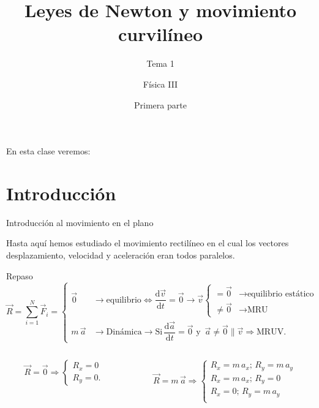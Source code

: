 \documentclass[11pt,handout,aspectratio=1610]{beamer}
\title{Leyes de Newton y movimiento curvilíneo}
\subtitle{Tema 1}
\author{Física III}
\institute{Instituto de Tecnología e Ingeniería \\ \vspace{0.25cm} Universidad Nacional de Hurlingham}
\date{Primera parte}
\newcommand{\fdiff}[2]{\dfrac{\text{d} #1}{\text{d} #2}}
\begin{document}
\frame{\titlepage}

\begin{frame}{En esta clase veremos:}
    \tableofcontents[hideallsubsections]
\end{frame}

\section{Introducción}

\begin{frame}{Introducción al movimiento en el plano}

    Hasta aquí hemos estudiado el movimiento rectilíneo en el cual los vectores desplazamiento, velocidad y aceleración eran todos paralelos.

    \begin{block}{Repaso}
        $$
            \vec{R} = \sum_{i=1}^{N} \vec{F}_i =
            \begin{cases}
                \vec{0} & \rightarrow \text{equilibrio} \Leftrightarrow  \fdiff{\vec{v}}{t} = \vec{0} \rightarrow \vec{v} \begin{cases}
                    = \vec{0} & \rightarrow \text{equilibrio estático} \\
                    \neq \vec{0} & \rightarrow \text{MRU} 
                \end{cases} \\
                m \, \vec{a} & \rightarrow \text{Dinámica} \rightarrow \text{Si} \, \fdiff{\vec{a}}{t} = \vec{0} \text{ y } \, \vec{a} \neq \vec{0} \parallel \vec{v} \Rightarrow \text{MRUV}.
            \end{cases}
        $$
        \begin{columns}
            \begin{column}{0.5\textwidth}
                $$
                \vec{R} = \vec{0} \Rightarrow 
                \begin{cases}
                    R_x = 0 \\
                    R_y = 0.
                \end{cases}
                $$
            \end{column}
            \begin{column}{0.5\textwidth}
                $$
                    \vec{R} = m \, \vec{a} \Rightarrow 
                    \begin{cases}
                        R_x = m \, a_x; \, R_y = m \, a_y \\
                        R_x = m \, a_x; \, R_y = 0 \\
                        R_x = 0; \, R_y = m \, a_y \\
                    \end{cases}
                $$
            \end{column}
        \end{columns}
    \end{block}

\end{frame}
    
\end{document}
